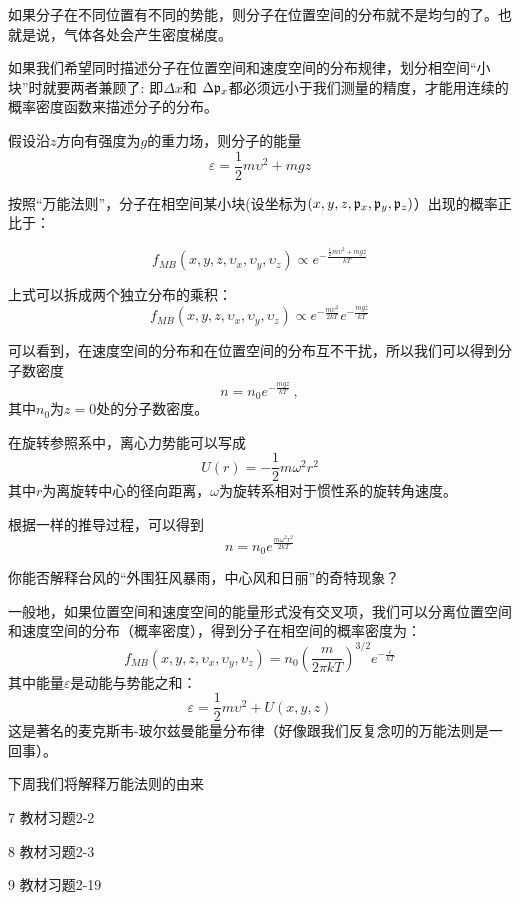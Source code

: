 \documentclass[CJK]{beamer}
\begin{document}
\begin{frame}
\bch
\bitem
\item{如果分子在不同位置有不同的势能，则分子在位置空间的分布就不是均匀的了。也就是说，气体各处会产生密度梯度。}
\item{如果我们希望同时描述分子在位置空间和速度空间的分布规律，划分相空间“小块”时就要两者兼顾了: 即$\Delta x$和
$\Delta {\mathfrak{p}}_x$都必须远小于我们测量的精度，才能用连续的概率密度函数来描述分子的分布。}
\eitem
\ech
\end{frame}


\begin{frame}
\bch
假设沿$z$方向有强度为$g$的重力场，则分子的能量
$$\varepsilon = \frac{1}{2}m\upsilon^2 + mgz$$

按照“万能法则”，分子在相空间某小块(设坐标为$(x, y, z, {\mathfrak{p}}_x, {\mathfrak{p}}_y, {\mathfrak{p}}_z)$）出现的概率正比于：

$$f_{MB}(x, y, z, \upsilon_x, \upsilon_y,\upsilon_z) \propto e^{-\frac{\frac{1}{2}m\upsilon^2 + mgz}{kT}}$$

上式可以拆成两个独立分布的乘积：
$$f_{MB}(x, y, z, \upsilon_x, \upsilon_y,\upsilon_z) \propto e^{-\frac{m\upsilon^2}{2kT}} e^{-\frac{mgz}{kT}}$$

可以看到，在速度空间的分布和在位置空间的分布互不干扰，所以我们可以得到分子数密度
$$n = n_0 e^{-\frac{mgz}{kT}}\, ,$$
其中$n_0$为$z=0$处的分子数密度。
\ech
\end{frame}

\begin{frame}
\bch
在旋转参照系中，离心力势能可以写成
$$U(r) = -\frac{1}{2}m\omega^2r^2$$
其中$r$为离旋转中心的径向距离，$\omega$为旋转系相对于惯性系的旋转角速度。

\skipline

根据一样的推导过程，可以得到
$$n = n_0 e^{\frac{m\omega^2r^2}{2kT}}$$
\ech
\end{frame}


\begin{frame}
\bch
{}
你能否解释台风的“外围狂风暴雨，中心风和日丽”的奇特现象？
\ech
\end{frame}

\begin{frame}
\bch
一般地，如果位置空间和速度空间的能量形式没有交叉项，我们可以分离位置空间和速度空间的分布（概率密度），得到分子在相空间的概率密度为：
$$f_{MB}(x, y, z,\upsilon_x, \upsilon_y,\upsilon_z) = n_0 \left(\frac{m}{2\pi kT}\right)^{3/2} e^{-\frac{\varepsilon}{kT}} $$
其中能量$\varepsilon$是动能与势能之和：
$$\varepsilon = \frac{1}{2}m\upsilon^2 + U(x,y,z)$$
这是著名的麦克斯韦-玻尔兹曼能量分布律（\wulian 好像跟我们反复念叨的万能法则是一回事）。
\ech
\end{frame}


\begin{frame}
\bch

下周我们将解释万能法则的由来
\ech
\end{frame}

\begin{frame}
\bch

\bitem
\item[7]{教材习题2-2}
\item[8]{教材习题2-3}
\item[9]{教材习题2-19}
\eitem

\ech
\end{frame}
\end{document}
